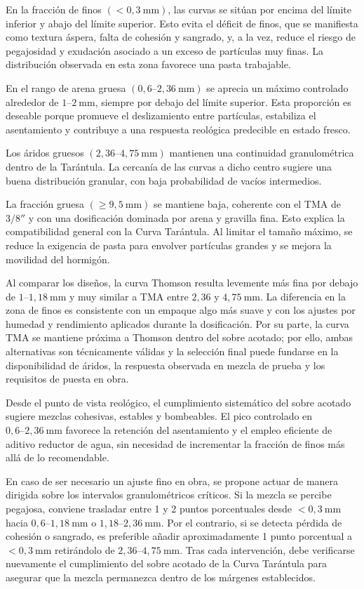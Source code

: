 En la fracción de finos \((<0{,}3~\mathrm{mm})\), las curvas se sitúan por encima del límite inferior y abajo del límite superior. Esto evita el déficit de finos, que se manifiesta como textura áspera, falta de cohesión y sangrado, y, a la vez, reduce el riesgo de pegajosidad y exudación asociado a un exceso de partículas muy finas. La distribución observada en esta zona favorece una pasta trabajable.

En el rango de arena gruesa \((0{,}6\text{–}2{,}36~\mathrm{mm})\) se aprecia un máximo controlado alrededor de \(1\text{–}2~\mathrm{mm}\), siempre por debajo del límite superior. Esta proporción es deseable porque promueve el deslizamiento entre partículas, estabiliza el asentamiento y contribuye a una respuesta reológica predecible en estado fresco.

Los áridos gruesos \((2{,}36\text{–}4{,}75~\mathrm{mm})\) mantienen una continuidad granulométrica dentro de la Tarántula. La cercanía de las curvas a dicho centro sugiere una buena distribución granular, con baja probabilidad de vacíos intermedios.

La fracción gruesa \((\ge 9{,}5~\mathrm{mm})\) se mantiene baja, coherente con el TMA de \(3/8''\) y con una dosificación dominada por arena y gravilla fina. Esto explica la compatibilidad general con la Curva Tarántula. Al limitar el tamaño máximo, se reduce la exigencia de pasta para envolver partículas grandes y se mejora la movilidad del hormigón.

Al comparar los diseños, la curva Thomson resulta levemente más fina por debajo de \(1\text{–}1{,}18~\mathrm{mm}\) y muy similar a TMA entre \(2{,}36\) y \(4{,}75~\mathrm{mm}\). La diferencia en la zona de finos es consistente con un empaque algo más suave y con los ajustes por humedad y rendimiento aplicados durante la dosificación. Por su parte, la curva TMA se mantiene próxima a Thomson dentro del sobre acotado; por ello, ambas alternativas son técnicamente válidas y la selección final puede fundarse en la disponibilidad de áridos, la respuesta observada en mezcla de prueba y los requisitos de puesta en obra.

Desde el punto de vista reológico, el cumplimiento sistemático del sobre acotado sugiere mezclas cohesivas, estables y bombeables. El pico controlado en \(0{,}6\text{–}2{,}36~\mathrm{mm}\) favorece la retención del asentamiento y el empleo eficiente de aditivo reductor de agua, sin necesidad de incrementar la fracción de finos más allá de lo recomendable.

En caso de ser necesario un ajuste fino en obra, se propone actuar de manera dirigida sobre los intervalos granulométricos críticos. Si la mezcla se percibe pegajosa, conviene trasladar entre 1 y 2 puntos porcentuales desde \(<0{,}3~\mathrm{mm}\) hacia \(0{,}6\text{–}1{,}18~\mathrm{mm}\) o \(1{,}18\text{–}2{,}36~\mathrm{mm}\). Por el contrario, si se detecta pérdida de cohesión o sangrado, es preferible añadir aproximadamente 1 punto porcentual a \(<0{,}3~\mathrm{mm}\) retirándolo de \(2{,}36\text{–}4{,}75~\mathrm{mm}\). Tras cada intervención, debe verificarse nuevamente el cumplimiento del sobre acotado de la Curva Tarántula para asegurar que la mezcla permanezca dentro de los márgenes establecidos.

